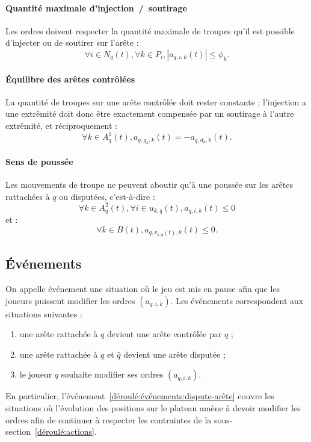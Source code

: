 \documentclass[a4paper,11pt,headings=normal]{scrartcl}
\theoremstyle{mythm}
\begin{document}
\paragraph{Quantité maximale d'injection~/~soutirage} Les ordres doivent
respecter la quantité maximale de troupes qu'il est possible
d'injecter ou de soutirer sur l'arête :
\begin{equation}
    \forall i \in N_q(t), \forall k \in P_i, |a_{q,i,k}(t)| \leq \phi_k.
\end{equation}

\paragraph{{\'E}quilibre des arêtes contrôlées} La quantité de troupes
sur une arête contrôlée doit rester constante ; l'injection a une
extrêmité doit donc être exactement compensée par un soutirage à
l'autre extrêmité, et réciproquement :
\begin{equation}
    \forall k \in A^1_q(t), a_{q,g_k,k}(t) = -a_{q,d_k,k}(t).
\end{equation}

\paragraph{Sens de poussée} Les mouvements de troupe ne peuvent aboutir
qu'à une poussée sur les arêtes rattachées à $q$ ou disputées,
c'est-à-dire :
\begin{equation}
  \label{eq:sens-poussée:rattachée}
    \forall k \in A^2_q(t), \forall i \in u_{k,q}(t), a_{q,i,k}(t) \leq 0
\end{equation}
et :
\begin{equation}
  \label{eq:sens-poussée:disputée}
    \forall k \in B(t), a_{q,v_{k,q}(t),k}(t) \leq 0.
\end{equation}

\subsection{{\'E}vénements}

On appelle \og événement \fg{} une situation où le jeu est mis en
pause afin que les joueurs puissent modifier les ordres
$(a_{q,i,k})$. Les événements correspondent aux situations suivantes :
\begin{enumerate}
  \item\label{déroulé:événements:contrôle-arête} une arête rattachée à
    $q$ devient une arête contrôlée par $q$ ;

  \item\label{déroulé:événements:dispute-arête} une arête rattachée à
    $q$ et $\bar q$ devient une arête disputée ;

  \item\label{déroulé:événements:changement-ordre} le joueur $q$
    souhaite modifier ses ordres $(a_{q,i,k})$.
\end{enumerate}
En particulier, l'événement~\ref{déroulé:événements:dispute-arête}
couvre les situations où l'évolution des positions sur le plateau
amène à devoir modifier les ordres afin de continuer à respecter les
contraintes de la sous-section~\ref{déroulé:actions}.
\end{document}
